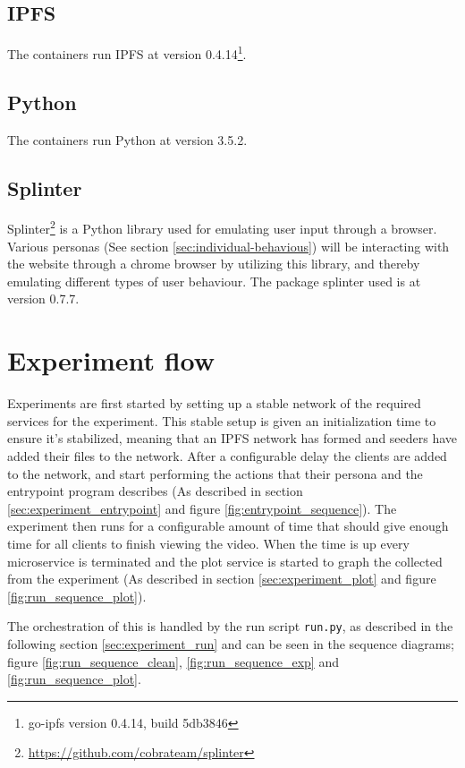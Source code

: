 \subsection{IPFS}
The containers run \acs{IPFS} at version 0.4.14\footnote{go-ipfs version 0.4.14, build 5db3846}.

\subsection{Python}
The containers run Python at version 3.5.2.

\subsection{Splinter}
\label{sec:setup_splinter}
Splinter\footnote{\url{https://github.com/cobrateam/splinter}} is a Python library used for emulating user input through a browser. Various personas (See section \ref{sec:individual-behavious}) will be interacting with the website through a chrome browser by utilizing this library, and thereby emulating different types of user behaviour.
The package splinter used is at version 0.7.7.

\section{Experiment flow}
Experiments are first started by setting up a stable network of the required services for the experiment. This stable setup is given an initialization time to ensure it's stabilized, meaning that an IPFS network has formed and seeders have added their files to the network.
After a configurable delay the clients are added to the network, and start performing the actions that their persona and the entrypoint program describes (As described in section \ref{sec:experiment_entrypoint} and figure \ref{fig:entrypoint_sequence}).
The experiment then runs for a configurable amount of time that should give enough time for all clients to finish viewing the video. When the time is up every microservice is terminated and the plot service is started to graph the collected from the experiment (As described in section \ref{sec:experiment_plot} and figure \ref{fig:run_sequence_plot}).

The orchestration of this is handled by the run script \texttt{run.py}, as described in the following section \ref{sec:experiment_run} and can be seen in the sequence diagrams; figure \ref{fig:run_sequence_clean}, \ref{fig:run_sequence_exp} and \ref{fig:run_sequence_plot}.

